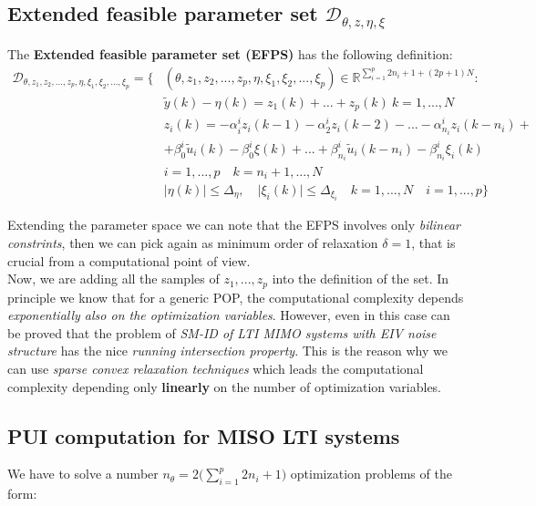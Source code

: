 \subsection{Extended feasible parameter set $\mathcal{D}_{\theta, z, \eta, \xi}$}
The \textbf{Extended feasible parameter set (EFPS)} has the following definition:
\begin{equation}
    \begin{aligned}
        \mathcal{D}_{\theta,z_1,z_2,...,z_p,\eta,\xi_1,\xi_2,...,\xi_p } = \big\{
            &(\theta,z_1,z_2,...,z_p,\eta,\xi_1,\xi_2,...,\xi_p) \in \mathbb{R}^{\sum_{i=1}^p{2n_i+1}+(2p+1)N}: \\
            &\tilde{y}(k)-\eta(k)= z_1(k)+\dots+z_p(k) \ k=1,...,N\\
            &z_i(k)=-\alpha_i^{i}z_i(k-1) -\alpha_2^{i}z_i(k-2)-...-\alpha_{n_i}^i z_{i}(k-{n_i})+\\
            &+\beta_0^{i}\tilde{u}_i(k)-\beta_0^{i}\xi(k)+...+\beta_{n_i}^{i}\tilde{u}_i(k-n_i)-\beta_{n_i}^i\xi_i(k) \\
            &i=1,...,p \quad k=n_i+1,...,N\\
            &\vert \eta(k) \vert \le \Delta_\eta, \quad \vert \xi_i(k) \vert \le \Delta_{\xi_i} \quad k=1,...,N \quad i=1,...,p
        \big\}
    \end{aligned}
\end{equation}

\noindent
Extending the parameter space we can note that the EFPS involves only \textit{bilinear constrints}, then we can pick again as minimum order of relaxation $\delta=1$, that is crucial from a computational point of view.\\
Now, we are adding all the samples of $z_1,...,z_p$ into the definition of the set. In principle we know that for a generic POP, the computational complexity depends \textit{exponentially also on the optimization variables}. However, even in this case can be proved that the problem of \textit{SM-ID of LTI MIMO systems with EIV noise structure} has the nice \textit{running intersection property}. This is the reason why we can use \textit{sparse convex relaxation techniques} which leads the computational complexity depending only \textbf{linearly} on the number of optimization variables.

\subsection{PUI computation for MISO LTI systems}
We have to solve a number $n_\theta=2\big(\sum_{i=1}^p{2n_i+1}\big)$ optimization problems of the form:

